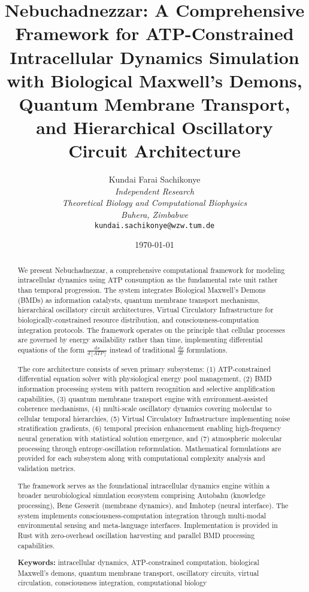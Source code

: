 \documentclass[12pt,a4paper]{article}
\title{\textbf{Nebuchadnezzar: A Comprehensive Framework for ATP-Constrained Intracellular Dynamics Simulation with Biological Maxwell's Demons, Quantum Membrane Transport, and Hierarchical Oscillatory Circuit Architecture}}
\author{
Kundai Farai Sachikonye\\
\textit{Independent Research}\\
\textit{Theoretical Biology and Computational Biophysics}\\
\textit{Buhera, Zimbabwe}\\
\texttt{kundai.sachikonye@wzw.tum.de}
}
\date{\today}
\begin{document}
\maketitle

\begin{abstract}
We present Nebuchadnezzar, a comprehensive computational framework for modeling intracellular dynamics using ATP consumption as the fundamental rate unit rather than temporal progression. The system integrates Biological Maxwell's Demons (BMDs) as information catalysts, quantum membrane transport mechanisms, hierarchical oscillatory circuit architectures, Virtual Circulatory Infrastructure for biologically-constrained resource distribution, and consciousness-computation integration protocols. The framework operates on the principle that cellular processes are governed by energy availability rather than time, implementing differential equations of the form $\frac{dx}{d[ATP]}$ instead of traditional $\frac{dx}{dt}$ formulations.

The core architecture consists of seven primary subsystems: (1) ATP-constrained differential equation solver with physiological energy pool management, (2) BMD information processing system with pattern recognition and selective amplification capabilities, (3) quantum membrane transport engine with environment-assisted coherence mechanisms, (4) multi-scale oscillatory dynamics covering molecular to cellular temporal hierarchies, (5) Virtual Circulatory Infrastructure implementing noise stratification gradients, (6) temporal precision enhancement enabling high-frequency neural generation with statistical solution emergence, and (7) atmospheric molecular processing through entropy-oscillation reformulation. Mathematical formulations are provided for each subsystem along with computational complexity analysis and validation metrics.

The framework serves as the foundational intracellular dynamics engine within a broader neurobiological simulation ecosystem comprising Autobahn (knowledge processing), Bene Gesserit (membrane dynamics), and Imhotep (neural interface). The system implements consciousness-computation integration through multi-modal environmental sensing and meta-language interfaces. Implementation is provided in Rust with zero-overhead oscillation harvesting and parallel BMD processing capabilities.

\textbf{Keywords:} intracellular dynamics, ATP-constrained computation, biological Maxwell's demons, quantum membrane transport, oscillatory circuits, virtual circulation, consciousness integration, computational biology
\end{abstract}
\end{document}
